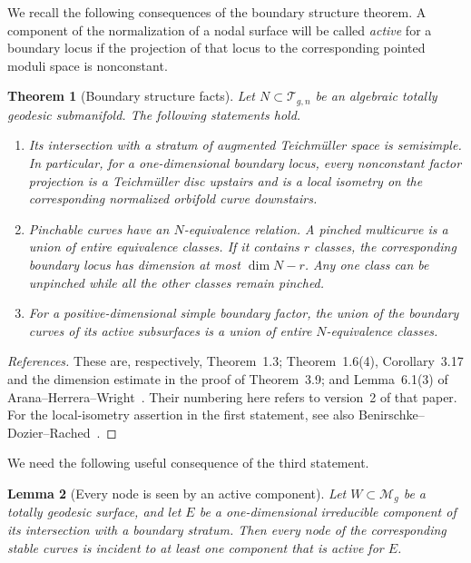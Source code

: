 \documentclass[11pt]{article}
\newcommand{\M}{\mathcal M}
\newcommand{\T}{\mathcal T}
\newtheorem{theorem}{Theorem}[section]
\newtheorem{lemma}[theorem]{Lemma}
\theoremstyle{remark}
\begin{document}
We recall the following consequences of the boundary structure
theorem. A component of the normalization of a nodal surface will
be called \emph{active} for a boundary locus if the projection of
that locus to the corresponding pointed moduli space is
nonconstant.

\begin{theorem}[Boundary structure facts]\label{thm:structure}
Let \(N\subset\T_{g,n}\) be an algebraic totally geodesic submanifold.
The following statements hold.
\begin{enumerate}
\item
Its intersection with a stratum of augmented Teichm\"uller space
is semisimple. In particular, for a one-dimensional boundary
locus, every nonconstant factor projection is a Teichm\"uller
disc upstairs and is a local isometry on the corresponding
normalized orbifold curve downstairs.

\item
Pinchable curves have an \(N\)-equivalence relation. A pinched
multicurve is a union of entire equivalence classes. If it
contains \(r\) classes, the corresponding boundary locus has
dimension at most \(\dim N-r\). Any one class can be unpinched
while all the other classes remain pinched.

\item
For a positive-dimensional simple boundary factor, the union of
the boundary curves of its active subsurfaces is a union of
entire \(N\)-equivalence classes.
\end{enumerate}
\end{theorem}

\begin{proof}[References]
These are, respectively, Theorem~1.3; Theorem~1.6(4),
Corollary~3.17 and the dimension estimate in the proof of
Theorem~3.9; and Lemma~6.1(3) of
Arana--Herrera--Wright~\cite{AHW}. Their numbering here refers
to version~2 of that paper.
For the local-isometry assertion in the first statement, see also
Benirschke--Dozier--Rached~\cite[Theorem~1.7 and
Proposition~9.2]{BDR}.
\end{proof}


We need the following useful consequence of the third statement.

\begin{lemma}[Every node is seen by an active component]\label{lem:active}
Let \(W\subset\M_g\) be a totally geodesic surface, and let \(E\)
be a one-dimensional irreducible component of its intersection
with a boundary stratum. Then every node of the corresponding
stable curves is incident to at least one component that is
active for \(E\).
\end{lemma}
\end{document}
